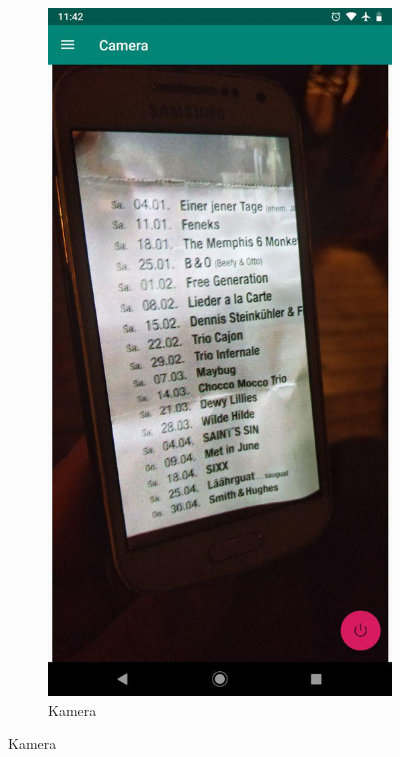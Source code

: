 \begin{figure}[H]
  \begin{subfigure}[b]{0.3\linewidth}
    \includegraphics[width=1\linewidth]{figures/camera.jpg}
    \caption{Kamera}
  \end{subfigure}

\end{figure}
